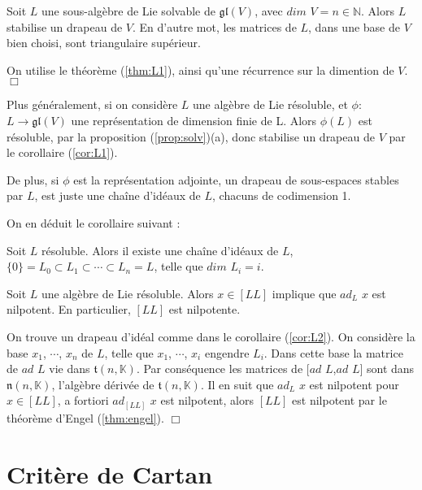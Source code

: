 \documentclass[a4paper,openany,12pt]{report}
\newcommand{\KK}{\mathbb{K}}
\newcommand{\NN}{\mathbb{N}}
\newcommand{\gl}{\mathfrak{gl}}
\newcommand{\ttt}{\mathfrak{t}}
\newcommand{\nn}{\mathfrak{n}}
\theoremstyle{break}
{\theorembodyfont{\upshape}
\newtheorem*{rmq}{Remarque :}
\newtheorem*{prv}{Preuve :}
\newtheorem*{ex}{Exemples :}
\newtheorem*{exe}{Exemple : }
\newtheorem*{nota}{Notation :}
\newtheorem*{dem}{D\'emonstration :}}
\begin{document}
\begin{cor}\label{cor:L1}
\quad Soit $L$ une sous-algèbre de Lie solvable de $\gl(V)$, avec $dim$ $V = n \in \NN$. Alors $L$ stabilise un drapeau de $V$.
En d'autre mot, les matrices de $L$, dans une base de $V$ bien choisi, sont triangulaire supérieur.
\end{cor}

\begin{prv}
\quad On utilise le théorème (\ref{thm:L1}), ainsi qu'une récurrence sur la dimention de $V$. $\Box$
\end{prv}

\quad Plus généralement, si on considère $L$ une algèbre de Lie résoluble, et $\phi$: $L \to \gl(V)$ une représentation de dimension finie de L. Alors $\phi(L)$ est résoluble, par la proposition (\ref{prop:solv})(a), donc stabilise un drapeau de $V$ par le corollaire (\ref{cor:L1}).

\quad De plus, si $\phi$ est la représentation adjointe, un drapeau de sous-espaces stables par $L$, est juste une chaîne d'idéaux de $L$, chacuns de codimension 1.

On en déduit le corollaire suivant :

\begin{cor}\label{cor:L2}
\quad Soit $L$ résoluble. 
Alors il existe une chaîne d'idéaux de $L$, $\{0\}=L_{0} \subset L_{1} \subset \cdots \subset L_{n} = L$, telle que $dim$ $L_{i}=i$.
\end{cor}

\begin{cor}\label{cor:L3}
\quad Soit $L$ une algèbre de Lie résoluble. Alors $x \in [LL]$ implique que $ad_{L}$ $x$ est nilpotent.
En particulier, $[LL]$ est nilpotente.
\end{cor}

\begin{prv}
\quad On trouve un drapeau d'idéal comme dans le corollaire (\ref{cor:L2}). On considère la base $x_{1}$, $\cdots$, $x_{n}$ de $L$, telle que $x_{1}$, $\cdots$, $x_{i}$ engendre $L_{i}$. Dans cette base la matrice de $ad$ $L$ vie dans $\ttt(n,\KK)$. Par conséquence les matrices de $[ad$ $L$,$ad$ $L]$ sont dans $\nn(n,\KK)$, l'algèbre dérivée de $\ttt(n,\KK)$. Il en suit que $ad_{L}$ $x$ est nilpotent pour $x \in [LL]$, a fortiori $ad_{[LL]}$ $x$ est nilpotent, alors $[LL]$ est nilpotent par le théorème d'Engel (\ref{thm:engel}). $\Box$
\end{prv}

\chapter{Critère de Cartan}
\end{document}
